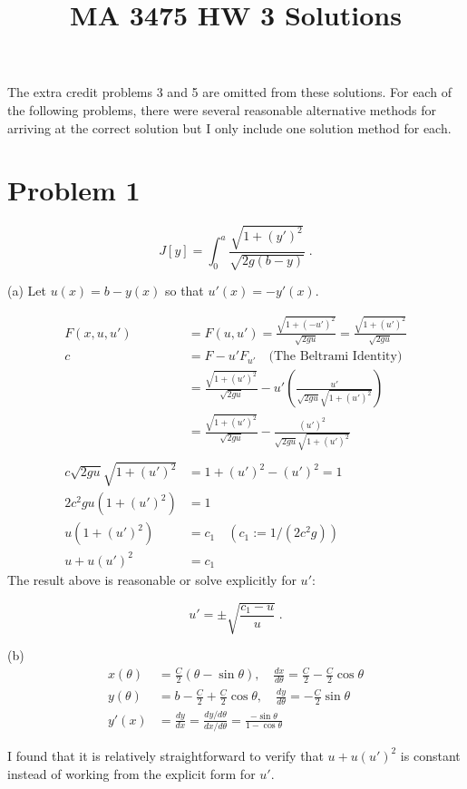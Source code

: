 \documentclass[a4paper]{article}
\title{MA 3475 HW 3 Solutions}
\begin{document}
\maketitle

The extra credit problems 3 and 5 are omitted from these solutions. For each of the following problems, there were several reasonable alternative methods for arriving at the correct solution but I only include one solution method for each. 


\section*{Problem 1}

$$J[y] = \int_0^a \frac{\sqrt{1+(y')^2}}{\sqrt{2g(b-y)}} \;.$$

(a) Let $u(x) = b-y(x)$ so that $u'(x) = -y'(x)$. 

\begin{align*}
F(x,u,u') &= F(u,u') = \frac{\sqrt{1+(-u')^2}}{\sqrt{2gu}} = \frac{\sqrt{1+(u')^2}}{\sqrt{2gu}} \\
c &= F - u'F_{u'} \quad \text{(The Beltrami Identity)} \\
&= \frac{\sqrt{1+(u')^2}}{\sqrt{2gu}} - u'\left( \frac{u'}{\sqrt{2gu}\sqrt{1+(u')^2}} \right) \\
&= \frac{\sqrt{1+(u')^2}}{\sqrt{2gu}} - \frac{(u')^2}{\sqrt{2gu}\sqrt{1+(u')^2}}\\
\\
c\sqrt{2gu}\sqrt{1+(u')^2} &= 1+(u')^2 - (u')^2 = 1 \\
2c^2gu(1+(u')^2) &= 1 \\
u(1+(u')^2) &= c_1 \quad (c_1 := 1/(2c^2g))\\
u + u(u')^2 &= c_1
\end{align*}
The result above is reasonable or solve explicitly for $u'$:

$$u' = \pm \sqrt{\frac{c_1 - u}{u}} \;.$$

(b)
\begin{align*}
x(\theta) &= \frac{C}{2}(\theta - \sin \theta ), \quad\frac{dx}{d\theta} = \frac{C}{2} - \frac{C}{2}\cos \theta\\
y(\theta) &= b - \frac{C}{2} + \frac{C}{2}\cos \theta,\quad  \frac{dy}{d\theta} = -\frac{C}{2}\sin \theta\\
y'(x) &= \frac{dy}{dx} = \frac{dy/d\theta}{dx/d\theta} = \frac{-\sin \theta}{1-\cos \theta}
\end{align*}

I found that it is relatively straightforward to verify that $u + u(u')^2$ is constant instead of working from the explicit form for $u'$. 
\end{document}
